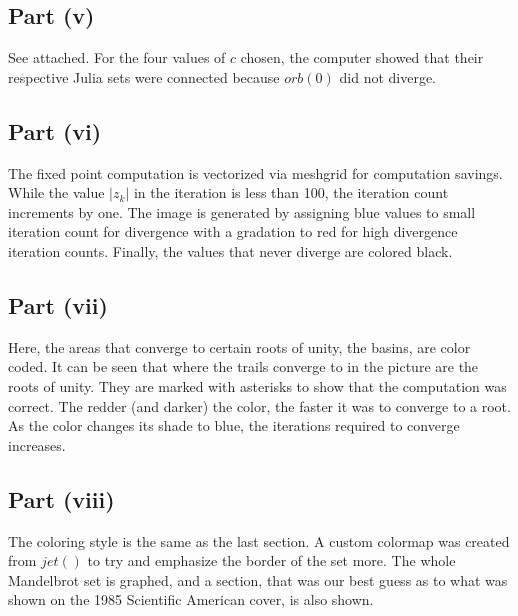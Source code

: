 \documentclass[12pt]{article}
\begin{document}
\subsection*{Part (v)}
See attached.
For the four values of $c$ chosen, the computer showed that their respective Julia sets were connected because $orb(0)$ did not diverge.

\subsection*{Part (vi)}
The fixed point computation is vectorized via meshgrid for computation savings.
While the value $|z_k|$ in the iteration is less than 100, the iteration count increments by one.
The image is generated by assigning blue values to small iteration count for divergence with a gradation to red for high divergence iteration counts.
Finally, the values that never diverge are colored black.

\subsection*{Part (vii)}
Here, the areas that converge to certain roots of unity, the basins, are color coded.
It can be seen that where the trails converge to in the picture are the roots of unity.
They are marked with asterisks to show that the computation was correct.
The redder (and darker) the color, the faster it was to converge to a root.
As the color changes its shade to blue, the iterations required 
to converge increases.

\subsection*{Part (viii)}
The coloring style is the same as the last section. 
A custom colormap was created from $jet()$ to try and emphasize the border of the set more.
The whole Mandelbrot set is graphed, and a section, that was our best guess as to what was shown on the 1985 Scientific American cover, is also shown.
\end{document}
